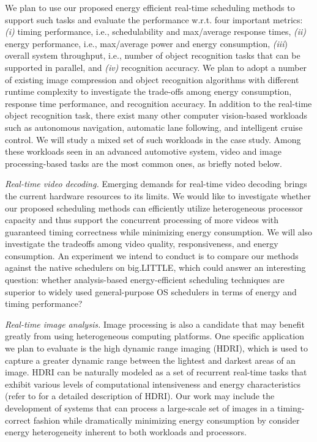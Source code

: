We plan to use our proposed energy efficient real-time scheduling methods to support such tasks and evaluate the performance w.r.t. four important metrics: \textit{(i)} timing performance, i.e., schedulability and max/average response times, \textit{(ii)} energy performance, i.e., max/average power and energy consumption, \textit{(iii}) overall system throughput, i.e., number of object recognition tasks that can be supported in parallel, and \textit{(iv)} recognition accuracy.  We plan to adopt a number of existing image compression and object recognition algorithms with different runtime complexity to investigate the trade-offs among energy consumption, response time performance, and recognition accuracy.  
  In addition to the real-time object recognition task, there exist many other computer vision-based workloads such as autonomous navigation, automatic lane following, and intelligent cruise control. We will study a mixed set of such workloads in the case study. Among these workloads seen in an advanced automotive system, video and image processing-based tasks are the most common ones, as briefly noted below.

\textit{Real-time video decoding.} Emerging demands for real-time video decoding brings the current hardware resources to its limits. We would like to investigate whether our proposed scheduling methods can efficiently utilize heterogeneous processor capacity and thus support the concurrent processing of more videos with guaranteed timing correctness while minimizing energy consumption. %
 We will also investigate the tradeoffs among video quality, responsiveness, and energy consumption. An experiment we intend to conduct is to compare our methods against the native schedulers on big.LITTLE, which could answer an interesting question: whether analysis-based energy-efficient scheduling techniques are superior to widely used general-purpose OS schedulers in terms of energy and timing performance?

\textit{Real-time image analysis.} Image processing is also a candidate that may benefit greatly from using heterogeneous computing platforms. One specific application we plan to evaluate is the high dynamic range imaging (HDRI), which is used to capture a greater dynamic range between the lightest and darkest areas of an image. HDRI can be naturally modeled as a set of recurrent real-time tasks that exhibit various levels of computational intensiveness and energy characteristics  (refer to \cite{kuang2007evaluating} for a detailed description of HDRI). Our work may include the development of systems that can process a large-scale set of images in a timing-correct fashion while dramatically minimizing energy consumption by consider energy heterogeneity inherent to both workloads and processors.